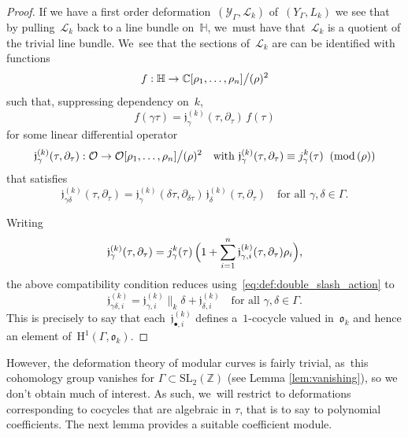 \documentclass[JEP,XML,SOM,Unicode,published]{cedram}
\let\oldbullet\bullet
\renewcommand{\bullet}{{\scriptscriptstyle\oldbullet}}
\theoremstyle{plain}
\theoremstyle{definition}
\newcommand{\tx}{\text}
\newcommand{\bbC}{\ensuremath{\mathbb{C}}}
\newcommand{\bbZ}{\ensuremath{\mathbb{Z}}}
\newcommand{\cL}{\ensuremath{\mathcal{L}}}
\newcommand{\cO}{\ensuremath{\mathcal{O}}}
\newcommand{\cY}{\ensuremath{\mathcal{Y}}}
\newcommand{\frakj}{\ensuremath{\mathfrak{j}}}
\newcommand{\frako}{\ensuremath{\mathfrak{o}}}
\newcommand{\rmH}{\ensuremath{\mathrm{H}}}
\newcommand{\defcol}{\mathrel{:}}
\renewcommand{\pmod}[1]{\;(\mathrm{mod}\, #1)}
\newcommand{\SL}[1]{\ensuremath{\mathrm{SL}_{#1}}}
\newcommand{\HS}{\ensuremath{\mathbb{H}}}
\let\Ga\Gamma
\let\ga\gamma
\begin{document}
\begin{proof}
If we have a first order deformation~$(\cY_\Ga,\cL_k)$ of~$(Y_\Ga,L_k)$ we see that by pulling~$\cL_k$ back to a line bundle on~$\HS$, we~must have that~$\cL_k$ is a quotient of the trivial line bundle. We~see that the sections of~$\cL_k$ are can be identified with functions
\begin{equation*}
f \defcol \HS \to \bbC [ \rho_1,\ldots,\rho_n ] \big\slash (\rho)^2
\end{equation*}
such that, suppressing dependency on~$k$,
\begin{equation*}
f(\ga\tau) = \frakj^{(k)}_\ga(\tau,\partial_\tau)\, f(\tau)
\end{equation*}
for some linear differential operator
\begin{equation*}
\frakj^{(k)}_\ga(\tau, \partial_\tau)
\defcol \cO \to \cO[ \rho_1,\ldots,\rho_n ] \big\slash (\rho)^2
\quad\tx{with\ }
\frakj^{(k)}_\ga(\tau,\partial_\tau)
\equiv
j_\ga^k(\tau)
\;\pmod{(\rho)}
\end{equation*}
that satisfies
\begin{equation*}
\frakj^{(k)}_{\ga\delta}(\tau,\partial_\tau)
=
\frakj^{(k)}_\ga(\delta\tau, \partial_{\delta \tau})\, \frakj^{(k)}_\delta(\tau,\partial_\tau)
\quad
\tx{for all\ }\ga, \delta \in \Ga
\tx{.}
\end{equation*}

Writing
\begin{equation}
\label{eq:first_order_deformation_cocycle_line_bundle_decomposition}
\frakj^{(k)}_\ga(\tau, \partial_\tau)
=
j^k_\ga(\tau)\,
\Bigl(1 + \sum_{i=1}^n \frakj^{(k)}_{\ga,i}(\tau, \partial_\tau) \rho_i \Bigr)
\tx{,}
\end{equation}
the above compatibility condition reduces using~\eqref{eq:def:double_slash_action} to
\begin{equation}
\label{eq:first_order_deformation_cocycle_line_bundle_relations}
\frakj^{(k)}_{\ga\delta, i}
=
\frakj^{(k)}_{\ga,i}\big\|_k \delta + \frakj^{(k)}_{\delta,i}
\quad
\tx{for all\ }
\ga,\delta\in\Ga
\tx{.}
\end{equation}
This is precisely to say that each~$\frakj^{(k)}_{\bullet,i}$ defines a~$1$-cocycle valued in~$\frako_k$ and hence an element of~$\rmH^1(\Ga,\frako_k)$.
\end{proof}
However, the deformation theory of modular curves is fairly trivial, as~this cohomology group vanishes for $\Ga\subset \SL2(\bbZ)$ (see Lemma \ref{lem:vanishing}), so we don't obtain much of interest. As such, we~will restrict to deformations corresponding to cocycles that are algebraic in $\tau$, that is to say to polynomial coefficients. The next lemma provides a suitable coefficient module.
\end{document}
